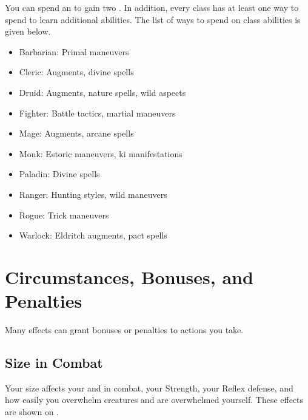         You can spend an  to gain two .
        In addition, every class has at least one way to spend  to learn additional abilities.
        The list of ways to spend  on class abilities is given below.
        \begin{itemize}
            \item Barbarian: Primal maneuvers
            \item Cleric: Augments, divine spells
            \item Druid: Augments, nature spells, wild aspects
            \item Fighter: Battle tactics, martial maneuvers
            \item Mage: Augments, arcane spells
            \item Monk: Estoric maneuvers, ki manifestations
            \item Paladin: Divine spells
            \item Ranger: Hunting styles, wild maneuvers
            \item Rogue: Trick maneuvers
            \item Warlock: Eldritch augments, pact spells
        \end{itemize}

\section{Circumstances, Bonuses, and Penalties}

    Many effects can grant bonuses or penalties to actions you take.

    \subsection{Size in Combat}\label{Size in Combat}
        Your size affects your  and  in combat, your Strength, your Reflex defense, and how easily you overwhelm creatures and are overwhelmed yourself.
        These effects are shown on .

